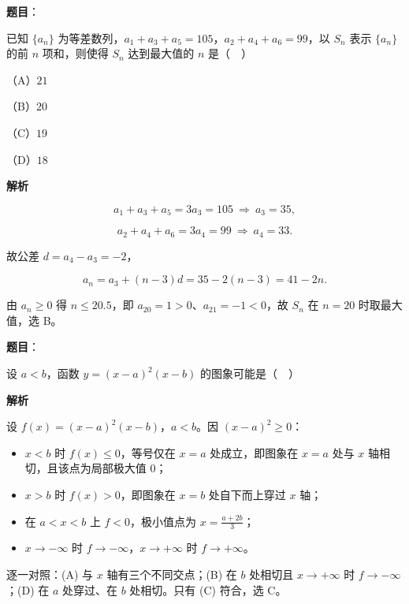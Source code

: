 \begin{answer}

\textbf{题目}：

已知 $\{a_n\}$ 为等差数列，$a_1+a_3+a_5=105$，$a_2+a_4+a_6=99$，以 $S_n$ 表示 $\{a_n\}$ 的前 $n$ 项和，则使得 $S_n$ 达到最大值的 $n$ 是（　）

（A）$21$

（B）$20$

（C）$19$

（D）$18$

\textbf{解析}

\nopagebreak[4]
\[a_1+a_3+a_5=3a_3=105\ \Longrightarrow\ a_3=35,\]

\nopagebreak[4]
\[a_2+a_4+a_6=3a_4=99\ \Longrightarrow\ a_4=33 .\]

故公差 $d=a_4-a_3=-2$，

\nopagebreak[4]
\[a_n=a_3+(n-3)d=35-2(n-3)=41-2n .\]

由 $a_n\geqslant0$ 得 $n\leqslant20.5$，即 $a_{20}=1>0$、$a_{21}=-1<0$，故 $S_n$ 在 $n=20$ 时取最大值，选 B。


\end{answer}
\begin{answer}

\textbf{题目}：

设 $a<b$，函数 $y=(x-a)^2(x-b)$ 的图象可能是（　）
\nopagebreak[4]
\begin{center}\end{center}
\nopagebreak[4]
\textbf{解析}

设 $f(x)=(x-a)^2(x-b)$，$a<b$。因 $(x-a)^2\geqslant0$：

\begin{itemize}
\item $x<b$ 时 $f(x)\leqslant0$，等号仅在 $x=a$ 处成立，即图象在 $x=a$ 处与 $x$ 轴相切，且该点为局部极大值 $0$；
\item $x>b$ 时 $f(x)>0$，即图象在 $x=b$ 处自下而上穿过 $x$ 轴；
\item 在 $a<x<b$ 上 $f<0$，极小值点为 $x=\frac{a+2b}{3}$；
\item $x\to-\infty$ 时 $f\to-\infty$，$x\to+\infty$ 时 $f\to+\infty$。
\end{itemize}

逐一对照：(A) 与 $x$ 轴有三个不同交点；(B) 在 $b$ 处相切且 $x\to+\infty$ 时 $f\to-\infty$；(D) 在 $a$ 处穿过、在 $b$ 处相切。只有 (C) 符合，选 C。


\end{answer}
